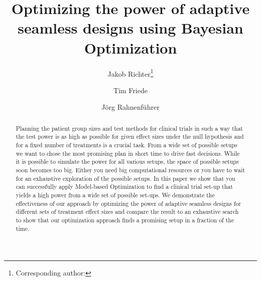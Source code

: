 \documentclass[bimj,fleqn]{w-art}
\theoremstyle{plain}
\theoremstyle{definition}
\begin{document}

\title[Model-based Optimization of Adaptive Seamless Designs]{Optimizing the power of adaptive seamless designs using Bayesian Optimization} %
\author[Jakob Richter {\it{et al.}}]{Jakob Richter\footnote{Corresponding author: {}}} 
\address[\inst{1}]{Fakultät Statistik, Technische Universität Dortmund, 44221 Dortmund}
\author[dd]{Tim Friede}
\address[\inst{2}]{Institut für Medizinische Statistik, Universitätsmedizin Göttingen, 37073 Göttingen}
\author[]{Jörg Rahnenführer} %
   

\begin{abstract}
Planning the patient group sizes and test methods for clinical trials in such a way that the test power is as high as possible for given effect sizes under the null hypothesis and for a fixed number of treatments is a crucial task.
From a wide set of possible setups we want to chose the most promising plan in short time to drive fast decisions.
While it is possible to simulate the power for all various setups, the space of possible setups soon becomes too big.
Either you need big computational resources or you have to wait for an exhaustive exploration of the possible setups.
In this paper we show that you can successfully apply Model-based Optimization to find a clinical trial set-up that yields a high power from a wide set of possible set-ups.
We demonstrate the effectiveness of our approach by optimizing the power of adaptive seamless designs for different sets of treatment effect sizes and compare the result to an exhaustive search to show that our optimization approach finds a promising setup in a fraction of the time.
\end{abstract}
\end{document}
